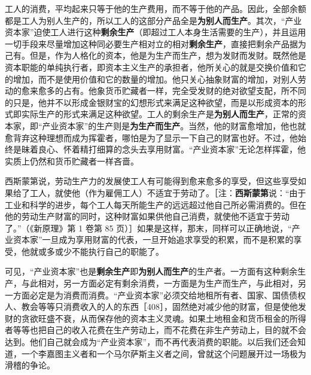 工人的消费，平均起来只等于他的生产费用，而不等于他的产品。因此，全部余额都是工人为别人生产的，所以工人的这部分产品全是\textbf{为别人而生产}。其次，“产业资本家”迫使工人进行这种\textbf{剩余生产}（即超过工人本身生活需要的生产），并且运用一切手段来尽量增加这种同必要生产相对立的相对\textbf{剩余生产}，直接把剩余产品据为己有。但是，作为人格化的资本，他是为生产而生产，想为发财而发财。既然他是资本职能的单纯执行者，即资本主义生产的承担者，他所关心的就是交换价值和它的增加，而不是使用价值和它的数量的增加。他只关心抽象财富的增加，对别人劳动的愈来愈多的占有。他象货币贮藏者一样，完全受发财的绝对欲望支配，所不同的只是，他并不以形成金银财宝的幻想形式来满足这种欲望，而是以形成资本的形式即实际生产的形式来满足这种欲望。工人的剩余生产是\textbf{为别人而生产}，正常的资本家，即“产业资本家”的生产则是\textbf{为生产而生产}。当然，他的财富愈增加，他也就愈背弃这种理想而成为挥霍者，哪怕是为了显示一下自己的财富也好。不过，他始终是昧着良心、怀着精打细算的念头去享用财富。“产业资本家”无论怎样挥霍，他实质上仍然和货币贮藏者一样吝啬。

西斯蒙第说，劳动生产力的发展使工人有可能得到愈来愈多的享受，但这些享受如果给了工人，就使他（作为雇佣工人）不适宜于劳动了。［注：\textbf{西斯蒙第}说：“由于工业和科学的进步，每个工人每天所能生产的远远超过他自己所必需消费的。但在他的劳动生产财富的同时，这种财富如果供他自己消费，就使他不适宜于劳动了。”（《新原理》第 1 卷第 85 页）］如果是这样，那末，同样可以正确地说，“产业资本家”一旦成为享用财富的代表，一旦开始追求享受的积累，而不是积累的享受，他就或多或少不能执行自己的职能了。

可见，“产业资本家”也是\textbf{剩余生产}即\textbf{为别人而生产}的生产者。一方面有这种剩余生产，与此相对，另一方面必定有剩余消费，一方面是为生产而生产，与此相对，另一方面必定是为消费而消费。“产业资本家”必须交给地租所有者、国家、国债债权人、教会等等只消费收入的人的东西［408］，固然绝对减少他的财富，但是使他发财的贪欲旺盛不衰，从而保存他的资本主义灵魂。如果土地租金和货币租金的所得者等等也把自己的收入花费在生产劳动上，而不花费在非生产劳动上，目的就不会达到。他们自己就会成为“产业资本家”，而不再代表消费的职能。以后我们还会知道，一个李嘉图主义者和一个马尔萨斯主义者之间，曾就这个问题展开过一场极为滑稽的争论。

